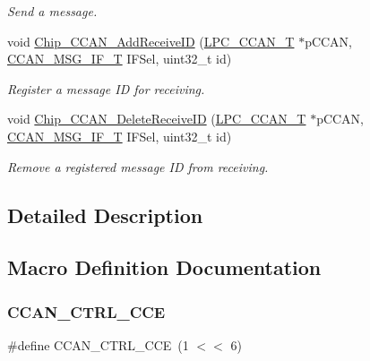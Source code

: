 \begin{DoxyCompactItemize}
\begin{DoxyCompactList}\small\item\em Send a message. \end{DoxyCompactList}\item 
void \hyperlink{group___c_c_a_n__18_x_x__43_x_x_gac0622af68b92aff26c9843d7536224c2}{Chip\+\_\+\+C\+C\+A\+N\+\_\+\+Add\+Receive\+ID} (\hyperlink{struct_l_p_c___c_c_a_n___t}{L\+P\+C\+\_\+\+C\+C\+A\+N\+\_\+T} $\ast$p\+C\+C\+AN, \hyperlink{group___c_c_a_n__18_x_x__43_x_x_gac90da0138c430750d2d7d55d4448cae7}{C\+C\+A\+N\+\_\+\+M\+S\+G\+\_\+\+I\+F\+\_\+T} I\+F\+Sel, uint32\+\_\+t id)
\begin{DoxyCompactList}\small\item\em Register a message ID for receiving. \end{DoxyCompactList}\item 
void \hyperlink{group___c_c_a_n__18_x_x__43_x_x_ga58ab5f836908b1611bd07ea9476172d6}{Chip\+\_\+\+C\+C\+A\+N\+\_\+\+Delete\+Receive\+ID} (\hyperlink{struct_l_p_c___c_c_a_n___t}{L\+P\+C\+\_\+\+C\+C\+A\+N\+\_\+T} $\ast$p\+C\+C\+AN, \hyperlink{group___c_c_a_n__18_x_x__43_x_x_gac90da0138c430750d2d7d55d4448cae7}{C\+C\+A\+N\+\_\+\+M\+S\+G\+\_\+\+I\+F\+\_\+T} I\+F\+Sel, uint32\+\_\+t id)
\begin{DoxyCompactList}\small\item\em Remove a registered message ID from receiving. \end{DoxyCompactList}\end{DoxyCompactItemize}


\subsection{Detailed Description}


\subsection{Macro Definition Documentation}
\mbox{\label{group___c_c_a_n__18_x_x__43_x_x_gaa65884720eb6b15b0acbff51e6be75b6}} 
\subsubsection{\texorpdfstring{C\+C\+A\+N\+\_\+\+C\+T\+R\+L\+\_\+\+C\+CE}{CCAN\_CTRL\_CCE}}
{\footnotesize\ttfamily \#define C\+C\+A\+N\+\_\+\+C\+T\+R\+L\+\_\+\+C\+CE~(1 $<$$<$ 6)}

